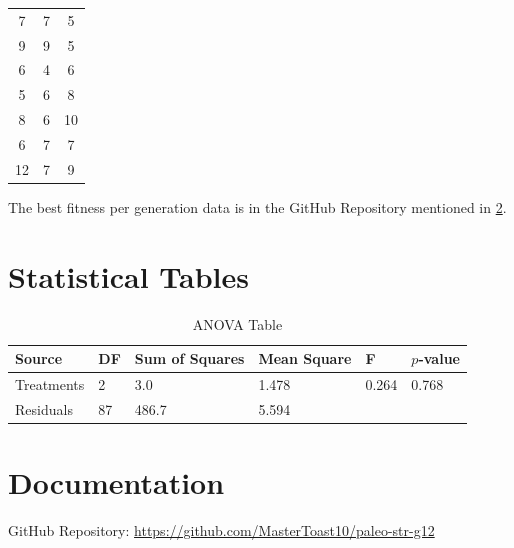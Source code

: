 \documentclass{strrespaper-trad}
\begin{document}
\begin{table}[htbp]
\begin{tabular}{ccc}
				7       & 7   & 5                         \\
				9       & 9   & 5                         \\
				6       & 4   & 6                         \\
				5       & 6   & 8                         \\
				8       & 6   & 10                        \\
				6       & 7   & 7                         \\
				12      & 7   & 9                         \\
				\bottomrule
			\end{tabular}
		\end{table}

		The best fitness per generation data is in the GitHub Repository mentioned in \ref{apx:documentation}.

	\chapter{Statistical Tables}
		\begin{table}[htbp]
			\centering
			\caption{ANOVA Table}
			\label{tab:ANOVA}
			\begin{tabular}{llllll}
				\toprule
				Source     & DF & Sum of Squares & Mean Square & F     & $p$-value \\
				\midrule
				Treatments & 2  & 3.0            & 1.478       & 0.264 & 0.768     \\
				Residuals  & 87 & 486.7          & 5.594       &       &           \\
				\bottomrule
			\end{tabular}
		\end{table}

	\chapter{Documentation} \label{apx:documentation}
		\medskip\bigskip
		GitHub Repository: \url{https://github.com/MasterToast10/paleo-str-g12}

		\lstset{language=Python, breaklines=true, numbers=left, stringstyle=\ttfamily\small, basicstyle=\singlespacing}
		
\end{document}

